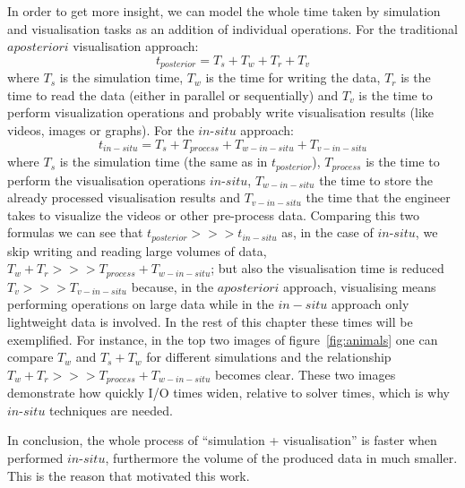 In order to get more insight, we can model the whole time taken by simulation
and visualisation tasks as an addition of individual operations. For the
traditional $a posteriori$ visualisation approach:
\begin{equation}
  t_{posterior} = T_s + T_w  + T_r + T_v
  \label{eq:first}
\end{equation}
where $T_s$ is the simulation time, $T_w$ is the time for writing the data,
$T_r$ is the time to read the data (either in parallel or sequentially) and $T_v$
is the time to perform visualization operations and probably write visualisation
results (like videos, images or graphs). For the $in$-$situ$ approach:
\begin{equation}
t_{in-situ} = T_s + T_{process} + T_{w-in-situ} + T_{v-in-situ}
  \label{eq:second}
\end{equation}
where $T_s$ is the simulation time (the same as in $t_{posterior}$),
$T_{process}$
is the time to perform the visualisation operations $in$-$situ$, $T_{w-in-situ}$
the time to store the already processed visualisation results and
$T_{v-in-situ}$ the time that the engineer takes to visualize the videos or
other pre-process data. Comparing this two formulas we can see that
$t_{posterior} >>> t_{in-situ}$ as, in the case of $in$-$situ$, we skip writing and reading large volumes
of data, $T_w  + T_r >>> T_{process} + T_{w-in-situ}$; but also the
visualisation time is reduced $T_v >>> T_{v-in-situ}$ because, in the $a
posteriori$ approach, visualising means performing operations on large data
while in the $in-situ$ approach only lightweight data is involved. In the rest
of this chapter these times will be exemplified. For instance, in the top two
images of figure~\ref{fig:animals} one can compare $T_w$ and $T_s + T_w$ for different
simulations and the relationship $T_w  + T_r >>> T_{process} + T_{w-in-situ}$
becomes clear. These two images demonstrate how quickly I/O times widen,
relative to solver times, which is why $in$-$situ$ techniques are needed.

In conclusion, the whole process of ``simulation + visualisation'' is faster when
performed $in$-$situ$, furthermore the volume of the produced data in much
smaller. This is the reason that motivated this work.




